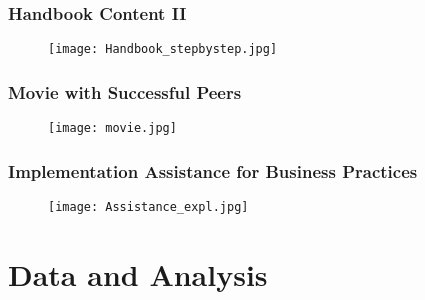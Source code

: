\documentclass[10pt]{beamer}
\begin{document}
\begin{frame}
\frametitle{Handbook Content II}

\begin{figure}[htbp]
	\centering
		\texttt{[image: Handbook\_stepbystep.jpg]}
	
	\label{height}
\end{figure}
\end{frame}

\begin{frame}
\frametitle{Movie with Successful Peers}
\begin{figure}[htbp]
	\centering
		\texttt{[image: movie.jpg]}
   
	\label{height}
\end{figure}
\end{frame}


\begin{frame}
\frametitle{Implementation Assistance for Business Practices}
\begin{figure}[htbp]
	\centering
		\texttt{[image: Assistance\_expl.jpg]}
	
	\label{height}
\end{figure}
\end{frame}


\section{Data and Analysis}
\end{document}
